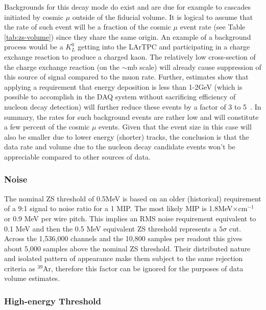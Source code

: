 Backgrounds for this decay mode do exist and are due for example to cascades
initiated by cosmic $\mu$ outside of the fiducial volume. It is logical to assume that the rate
of such event will be a fraction of the cosmic $\mu$ event rate (see Table \ref{tab:zs-volume})
since they share the same origin. An example of a background process would be a $K_L^0$ getting
into the LArTPC and participating in a charge exchange reaction to produce a charged kaon.
The relatively low cross-section of the charge exchange reaction (on the $\sim$mb scale) will already cause
suppression of this source of signal compared to the muon rate. Further, estimates show that
applying a requirement that energy deposition is less than 1-2GeV (which is possible to accomplish
in the DAQ system without sacrificing efficiency of nucleon decay detection) will further reduce
these events by a factor of 3 to 5~\cite{kudr_bkgd_pdk}.
In summary, the rates for such background events are rather low and will
constitute a few percent of the cosmic $\mu$ events. Given that the event size in this case
will also be smaller due to lower energy (shorter) tracks, the conclusion is that the data rate
and volume due to the nucleon decay candidate events won't be appreciable compared to
other sources of data.



\subsubsection{Noise}

The nominal ZS threshold of 0.5MeV is based on an older (historical) requirement of a
9:1 signal to noise ratio for a 1 MIP. The most likely MIP is 1.8MeV$\times$cm$^{-1}$ or 0.9 MeV
per wire pitch. This implies an RMS noise requirement equivalent to 0.1 MeV and then the 0.5 MeV
equivalent ZS threshold represents a $5\sigma$ cut. Across the 1,536,000 channels and the
10,800 samples per readout this gives about 5,000 samples above the nominal ZS threshold.
Their distributed nature and isolated pattern of appearance make them subject to the same rejection
criteria as $^{39}$Ar, therefore this factor can be ignored for the purposes of data volume estimates.


\subsubsection{High-energy Threshold}

